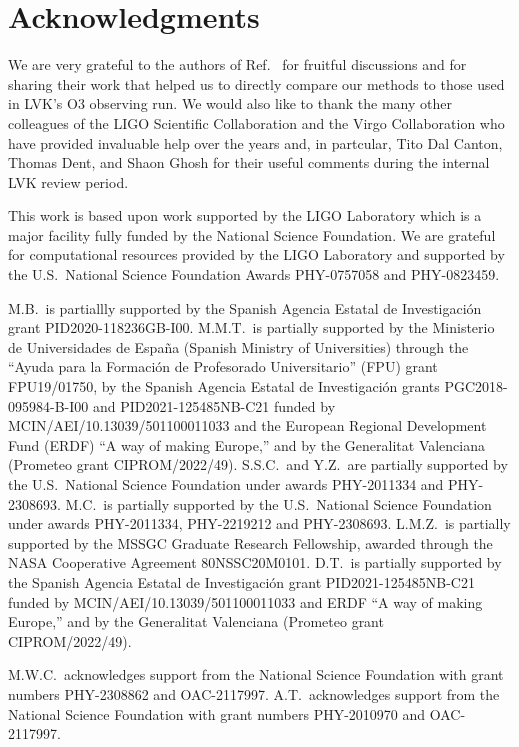 \section*{Acknowledgments}

We are very grateful to the authors of Ref.~\cite{Chatterjee:2019avs} for fruitful discussions and for sharing their work that helped us to directly compare our methods to those used in
\ac{LVK}'s \ac{O3} observing run. We would also like to thank the many other colleagues of the LIGO Scientific Collaboration and the Virgo Collaboration who have provided invaluable help
over the years and, in partcular, Tito Dal Canton, Thomas Dent, and Shaon Ghosh for their useful comments during the internal \ac{LVK} review period.

This work is based upon work supported by the LIGO Laboratory which is a major facility fully funded by the National Science Foundation. We are grateful for computational resources
provided by the LIGO Laboratory and supported by the U.S.\ National Science Foundation Awards PHY-0757058 and PHY-0823459. 

M.B.\ is partiallly supported by the Spanish Agencia Estatal de Investigaci\'on grant PID2020-118236GB-I00. M.M.T.\ is partially supported by the Ministerio de Universidades de Espa\~na
(Spanish Ministry of Universities) through the ``Ayuda para la Formaci\'on de Profesorado Universitario'' (FPU) grant FPU19/01750, by the Spanish Agencia Estatal de Investigaci\'on grants
PGC2018-095984-B-I00 and PID2021-125485NB-C21 funded by MCIN/AEI/10.13039/501100011033 and the European Regional Development Fund (ERDF) ``A way of making Europe,'' and by the Generalitat
Valenciana (Prometeo grant CIPROM/2022/49). S.S.C.\ and Y.Z.\ are partially supported by the U.S.\ National Science Foundation under awards PHY-2011334 and PHY-2308693. M.C.\ is partially
supported by the U.S.\ National Science Foundation under awards PHY-2011334, PHY-2219212 and PHY-2308693. L.M.Z.\ is partially supported by the MSSGC Graduate Research Fellowship, awarded
through the NASA Cooperative Agreement 80NSSC20M0101. D.T.~is partially supported by the Spanish Agencia Estatal de Investigaci\'on grant PID2021-125485NB-C21 funded by
MCIN/AEI/10.13039/501100011033 and ERDF ``A way of making Europe,'' and by the Generalitat Valenciana (Prometeo grant CIPROM/2022/49).

M.W.C.\ acknowledges support from the National Science Foundation with grant numbers PHY-2308862 and OAC-2117997. A.T.\ acknowledges support from the National Science Foundation with
grant numbers PHY-2010970 and OAC-2117997.

